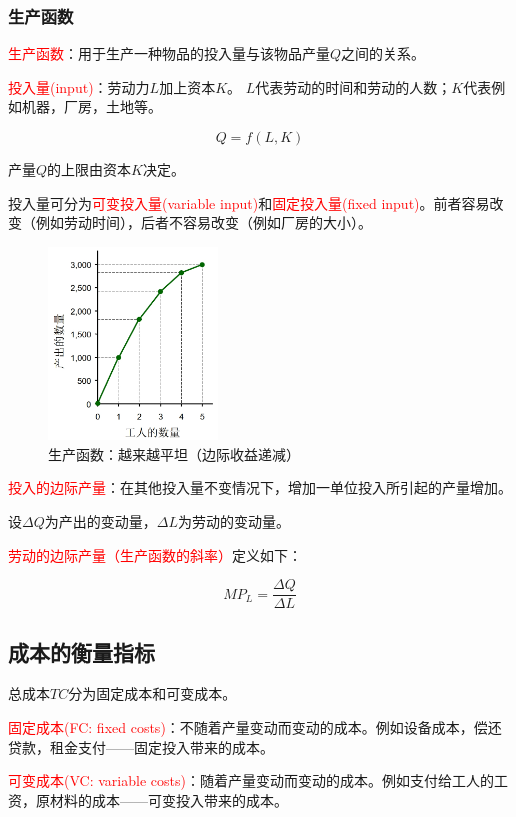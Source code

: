 \documentclass[12pt, a4paper]{article}
\begin{document}
\subsubsection{生产函数}
\textcolor{red}{生产函数}：用于生产一种物品的投入量与该物品产量\( Q \)之间的关系。

\textcolor{red}{投入量(input)}：劳动力\( L \)加上资本\( K \)。
\( L \)代表劳动的时间和劳动的人数；\( K \)代表例如机器，厂房，土地等。

\[ Q = f(L, K) \]

产量\( Q \)的上限由资本\( K \)决定。

投入量可分为\textcolor{red}{可变投入量(variable input)}和\textcolor{red}{固定投入量(fixed input)}。前者容易改变（例如劳动时间），后者不容易改变（例如厂房的大小）。

\begin{figure}[H]
  \centering
  \includegraphics[width=0.4\textwidth]{生产函数.png}
  \caption{生产函数：越来越平坦（边际收益递减）}
\end{figure}

\textcolor{red}{投入的边际产量}：在其他投入量不变情况下，增加一单位投入所引起的产量增加。

设\( \Delta Q \)为产出的变动量，\( \Delta L \)为劳动的变动量。

\textcolor{red}{劳动的边际产量（生产函数的斜率）}定义如下：

\[ MP_L = \frac{\Delta Q}{\Delta L} \]

\subsection{成本的衡量指标}

总成本\( TC \)分为固定成本和可变成本。

\textcolor{red}{固定成本(FC: fixed costs)}：不随着产量变动而变动的成本。例如设备成本，偿还贷款，租金支付——固定投入带来的成本。

\textcolor{red}{可变成本(VC: variable costs)}：随着产量变动而变动的成本。例如支付给工人的工资，原材料的成本——可变投入带来的成本。
\end{document}
